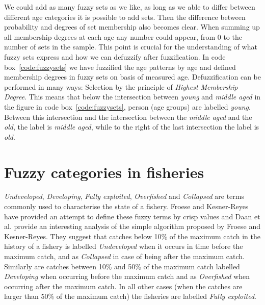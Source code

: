 \documentclass[11pt,fleqn]{book} %
\begin{document}
We could add as many fuzzy sets as we like, as long as we able to differ between different age categories it is possible to add sets. Then the difference between probability and degrees of set membership also becomes clear. When summing up all membership degrees at each age any number could appear, from 0 to the number of sets in the sample. This point is crucial for the understanding of what fuzzy sets express and how we can defuzzify after fuzzification. In code box~\ref{code:fuzzysets} we have fuzzified the age patterns by age and defined membership degrees in fuzzy sets on basis of measured age. Defuzzification can be performed in many ways: Selection by the principle of \textit{Highest Membership Degree}. This means that below the intersection between \textit{young} and \textit{middle aged} in the figure in code box~\ref{code:fuzzysets}, person (age groups) are labelled \textit{young}. Between this intersection and the intersection between the \textit{middle aged} and the \textit{old}, the label is \textit{middle aged}, while to the right of the last intersection the label is \textit{old}.

\section{Fuzzy categories in fisheries} 

\textit{Undeveloped}, \textit{Developing}, \textit{Fully exploited}, \textit{Overfished} and \textit{Collapsed} are terms commonly used to characterise the state of a fishery. Froese and Kesner-Reyes\cite{Froese2002} have provided an attempt to define these fuzzy terms by crisp values and Daan et al.\cite{Daan2011} provide an interesting analysis of the simple algorithm proposed by Froese and Kesner-Reyes. They suggest that catches below 10\% of the maximum catch in the history of a fishery is labelled \textit{Undeveloped} when it occurs in time before the maximum catch, and as \textit{Collapsed} in case of being after the maximum catch. Similarly are catches between 10\% and 50\% of the maximum catch labelled \textit{Developing} when occurring before the maximum catch and as \textit{Overfished} when occurring after the maximum catch. In all other cases (when the catches are larger than 50\% of the maximum catch) the fisheries are labelled \textit{Fully exploited}.
\end{document}
